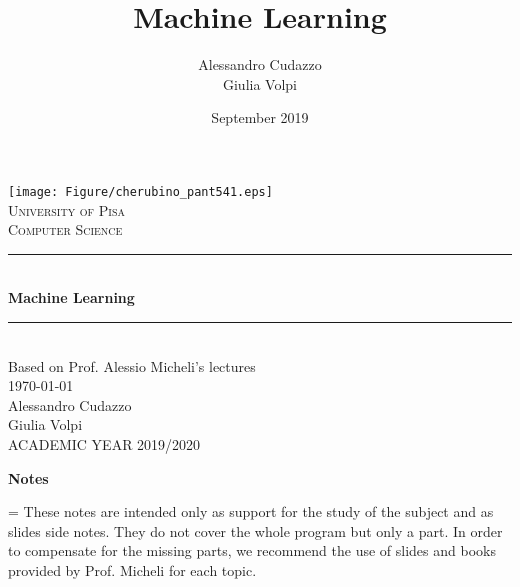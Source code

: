 \documentclass{article}
\title{Machine Learning}
\author{Alessandro Cudazzo\\ Giulia Volpi}
\date{September 2019}
\theoremstyle{break}
\theoremstyle{break}
\theoremstyle{break}
\theoremstyle{remark}
\begin{document}
\def\thesistitle{Machine Learning}
\def\thesisauthorfirst{Alessandro Cudazzo}
\def\thesisauthorsecond{Giulia Volpi}
\def\thesisdate{\today}
\def\theacademicyeas{ACADEMIC YEAR 2019/2020}


\begin{titlepage}
	\newcommand{\HRule}{\rule{\linewidth}{0.5mm}}
	\center

	\texttt{[image: Figure/cherubino\_pant541.eps]}\\[0.9cm]
	\textsc{\Large University of Pisa}\\[0.3cm]
	\textsc{\Large Computer Science}\\[0.6cm]
	\HRule \\[0.6cm]
	{ \LARGE \bfseries \thesistitle}\\[0.3cm]
	\HRule \\[0.6cm]
	{\large Based on Prof. Alessio Micheli's lectures}\\[0.6cm]
	{\large \thesisdate}\\[2.7cm]
    {\Large \thesisauthorfirst \\ \vspace{0.6cm} \thesisauthorsecond}\\[4cm]
    \vspace*{\fill}
	{\large \theacademicyeas}\\
	\clearpage
\end{titlepage}
\clearpage
\clearpage\thispagestyle{empty}\clearpage\setcounter{page}{1}


\cleardoublepage
\centerline{\large\bfseries Notes}
\nobreak
\vspace{1pc}
\begingroup\small
{}\textwidth
\rightskip=\leftskip
\noindent These notes are intended only as support for the study of the subject and as slides side notes. They do not cover the whole program but only a part. 
In order to compensate for the missing parts, we recommend the use of slides and books provided by Prof. Micheli for each topic. 
\end{document}
